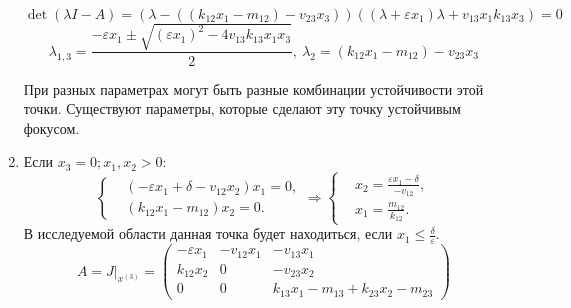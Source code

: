 \begin{enumerate}
            \[
                \det(\lambda I - A) = \left( \lambda - \left( \left( k_{12} x_1 - m_{12} \right) - v_{23} x_3 \right) \right) \left( (\lambda + \varepsilon x_1)\lambda + v_{13} x_1 k_{13} x_3 \right) = 0
            \]
            \[
                \lambda_{1,3} = \frac{-\varepsilon x_1 \pm \sqrt{ (\varepsilon x_1)^2 - 4 v_{13} k_{13} x_1 x_3 } }{2}, ~ 
                \lambda_2 = \left( k_{12} x_1 - m_{12} \right) - v_{23} x_3
            \]

            При разных параметрах могут быть разные комбинации устойчивости этой точки. Существуют параметры, которые сделают эту точку устойчивым фокусом.

        \item Если \( x_3 = 0; x_1, x_2 > 0 \):
            \[
                \left\{\begin{split}
                    & \left( -\varepsilon x_1 + \delta - v_{12} x_2 \right)x_1 = 0, \\
                    & ( k_{12} x_1 -m _{12} ) x_2 = 0. 
                \end{split}\right.
                \Rightarrow
                \left\{\begin{split}
                    & x_2 = \frac{ \varepsilon x_1 - \delta }{ -v_{12} }, \\
                    & x_1 = \frac{m_{12}}{k_{12}}. 
                \end{split}\right.
            \]
            В исследуемой области данная точка будет находиться, если \( x_1 \leq \frac{\delta}{\varepsilon}  \).
            \[
                A = J\big|_{x^{(3)}} = \left(
                    \begin{matrix}
                        -\varepsilon x_1 & -v_{12}  x_1  & -v_{13} x_1 \\
                        k_{12} x_2 & 0 & -v_{23} x_2 \\
                        0 & 0 & k_{13} x_1 - m_{13} + k_{23} x_2 - m_{23}
                    \end{matrix}
                \right)
            \]


\end{enumerate}
